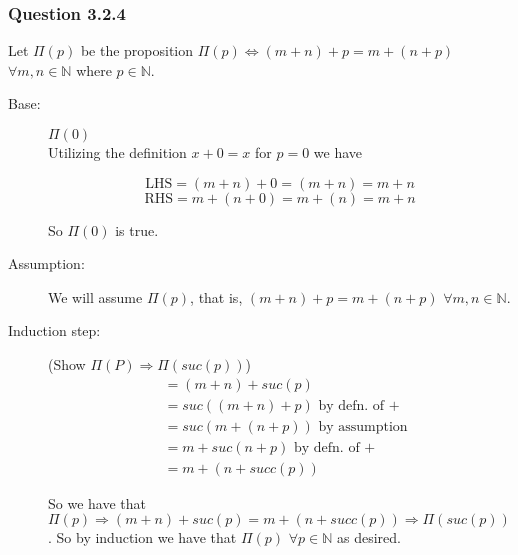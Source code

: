 \documentclass[10pt]{report}
\begin{document}
\subsubsection*{Question 3.2.4}

Let $\Pi(p)$ be the proposition $\Pi(p) \Leftrightarrow (m+n)+p = m+(n+p)$ $\forall m,n \in \mathbb{N}$ where $p\in \mathbb{N}$.

\begin{description}
\item[Base:] $\Pi(0)$ \\

Utilizing the definition $x+0=x$ for $p=0$ we have

$$\text{LHS} = (m+n)+0 = (m+n) = m+n$$
$$\text{RHS} = m+(n+0)=m+(n)=m+n$$

So $\Pi(0)$ is true.

\item[Assumption:] 

We will assume $\Pi(p)$, that is,  $(m+n)+p=m+(n+p)$ $\forall m,n \in \mathbb{N}$.

\item[Induction step:] (Show $\Pi(P) \Rightarrow \Pi(suc(p))$) \\

	\begin{align*}
	{}& = (m+n)+suc(p) \\
	{}& = suc((m+n)+p) \text{ by defn. of +} \\
	{}& = suc(m+(n+p)) \text{ by assumption} \\
	{}& = m+suc(n+p) \text{ by defn. of +} \\
	{}& = m+(n+succ(p))
	\end{align*}

So we have that $\Pi(p) \Rightarrow (m+n)+suc(p) = m+(n+succ(p)) \Rightarrow \Pi(suc(p))$. So by induction we have that $\Pi(p)$ $\forall p \in \mathbb{N}$ as desired.

\end{description}
\end{document}
